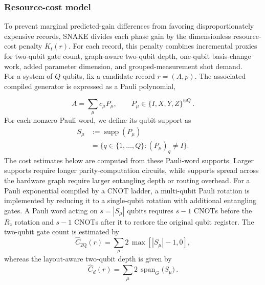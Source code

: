 \documentclass[
  reprint,
  amsmath,
  amssymb,
  aps,
  pra,
  nofootinbib,
  superscriptaddress,
  floatfix
]{revtex4-2}
\newcommand{\twq}{\mathrm{2Q}}
\begin{document}
\subsubsection{Resource-cost model}
%
\noindent
To prevent marginal predicted-gain differences from favoring disproportionately
expensive records, \textsc{SNAKE} divides each phase gain by the dimensionless
resource-cost penalty \(K_t(r)\). For each record, this penalty combines
incremental proxies for two-qubit gate count, graph-aware two-qubit depth,
one-qubit basis-change work, added parameter dimension, and grouped-measurement
shot demand.\\
\noindent
For a system of \(Q\) qubits, fix a candidate record \(r=(A,p)\). The associated compiled generator is expressed as a Pauli polynomial,

\begin{equation}
A=\sum_{\mu}c_{\mu}P_{\mu}, \qquad P_{\mu}\in\{I,X,Y,Z\}^{\otimes Q}\,.
\label{eq:pauli_expansion}
\end{equation}
%
For each nonzero Pauli word, we define its qubit support as
%
\begin{equation}
\begin{aligned}
S_{\mu}
&:=\operatorname{supp}(P_{\mu}) \\
&=\{q\in\{1,\ldots,Q\}:(P_{\mu})_q\ne I\}.
\end{aligned}
\label{eq:pauli_word_support}
\end{equation}
%
The cost estimates below are computed from these Pauli-word supports. Larger supports require longer parity-computation circuits, while supports spread across the hardware graph require larger entangling depth or routing overhead. For a Pauli exponential compiled by a CNOT ladder, a multi-qubit Pauli rotation is implemented by reducing it to a single-qubit rotation with additional entangling gates. A Pauli word acting on \(s=|S_{\mu}|\) qubits requires \(s-1\) \textsc{CNOT}s before the \(R_z\) rotation and \(s-1\) \textsc{CNOT}s after it to restore the original qubit register. The two-qubit gate count is estimated by
%
\begin{equation*}
\widehat C_{\twq}(r)=\sum_{\mu}2\,\max[|S_{\mu}|-1, 0],
\end{equation*}
whereas the layout-aware two-qubit depth is given by
\begin{equation*}
\widehat C_d(r)=\sum_{\mu}2\,\operatorname{span}_{G}
\bigl(S_{\mu}\bigr)\,.
\end{equation*}
\end{document}
